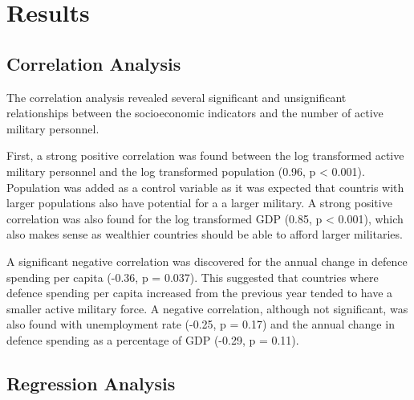 \chapter{Results}

\section{Correlation Analysis}

The correlation analysis revealed several significant and unsignificant relationships 
between the socioeconomic indicators and the number of active military personnel.

First, a strong positive correlation was found between the log transformed 
active military personnel and the log transformed population (0.96, p < 0.001).
Population was added as a control variable as it was expected that countris with 
larger populations also have potential for a a larger military. 
A strong positive correlation was 
also found for the log transformed GDP (0.85, p < 0.001), which also makes sense 
as wealthier countries should be able to afford larger militaries.

A significant negative correlation was discovered for the annual change in defence 
spending per capita (-0.36, p = 0.037). This suggested that countries where defence spending 
per capita increased from the previous year tended to have a smaller active military force.
A negative correlation, although not significant, was also found with unemployment rate 
(-0.25, p = 0.17) and the annual change in defence spending as a percentage of GDP 
(-0.29, p = 0.11).


\section{Regression Analysis}
